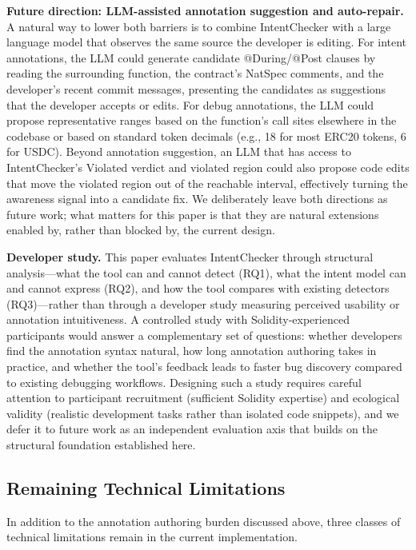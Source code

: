 \documentclass[pdflatex,sn-basic]{sn-jnl}%
\theoremstyle{thmstyleone}%
\theoremstyle{thmstyletwo}%
\theoremstyle{thmstylethree}%
\begin{document}
\smallskip
\noindent\textbf{Future direction: LLM-assisted annotation suggestion and auto-repair.}
A natural way to lower both barriers is to combine IntentChecker with a large language model that observes the same source the developer is editing.
For intent annotations, the LLM could generate candidate @During/@Post clauses by reading the surrounding function, the contract's NatSpec comments, and the developer's recent commit messages, presenting the candidates as suggestions that the developer accepts or edits.
For debug annotations, the LLM could propose representative ranges based on the function's call sites elsewhere in the codebase or based on standard token decimals (e.g., 18 for most ERC20 tokens, 6 for USDC).
Beyond annotation suggestion, an LLM that has access to IntentChecker's Violated verdict and violated region could also propose code edits that move the violated region out of the reachable interval, effectively turning the awareness signal into a candidate fix.
We deliberately leave both directions as future work; what matters for this paper is that they are natural extensions enabled by, rather than blocked by, the current design.

\smallskip
\noindent\textbf{Developer study.}
This paper evaluates IntentChecker through structural analysis---what the tool can and cannot detect (RQ1), what the intent model can and cannot express (RQ2), and how the tool compares with existing detectors (RQ3)---rather than through a developer study measuring perceived usability or annotation intuitiveness.
A controlled study with Solidity-experienced participants would answer a complementary set of questions: whether developers find the annotation syntax natural, how long annotation authoring takes in practice, and whether the tool's feedback leads to faster bug discovery compared to existing debugging workflows.
Designing such a study requires careful attention to participant recruitment (sufficient Solidity expertise) and ecological validity (realistic development tasks rather than isolated code snippets), and we defer it to future work as an independent evaluation axis that builds on the structural foundation established here.

\subsection{Remaining Technical Limitations}\label{sec:disc:tech}

In addition to the annotation authoring burden discussed above, three classes of technical limitations remain in the current implementation.
\end{document}
